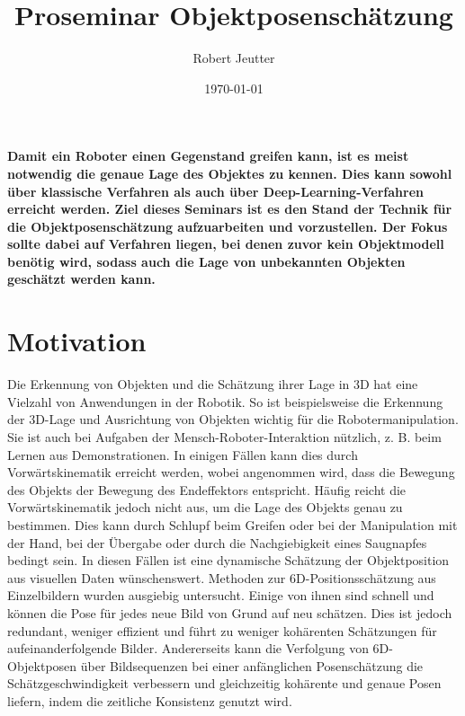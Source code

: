 \documentclass[a4paper, 11pt]{article}
\title{Proseminar Objektposenschätzung}
\author{Robert Jeutter}
\date{\today}
\begin{document}
\maketitle

\begin{multicols*}{2}
    \textbf{
        Damit ein Roboter einen Gegenstand greifen kann, ist es meist notwendig die genaue Lage des Objektes zu kennen. Dies kann sowohl über klassische Verfahren als auch über Deep-Learning-Verfahren erreicht werden. Ziel dieses Seminars ist es den Stand der Technik für die Objektposenschätzung aufzuarbeiten und vorzustellen. Der Fokus sollte dabei auf Verfahren liegen, bei denen zuvor kein Objektmodell benötig wird, sodass auch die Lage von unbekannten Objekten geschätzt werden kann.
    }

    \section{Motivation}
    Die Erkennung von Objekten und die Schätzung ihrer Lage in 3D hat eine Vielzahl von Anwendungen in der Robotik. So ist beispielsweise die Erkennung der 3D-Lage und Ausrichtung von Objekten wichtig für die Robotermanipulation. Sie ist auch bei Aufgaben der Mensch-Roboter-Interaktion nützlich, z. B. beim Lernen aus Demonstrationen.
    In einigen Fällen kann dies durch Vorwärtskinematik erreicht werden, wobei angenommen wird, dass die Bewegung des Objekts der Bewegung des Endeffektors entspricht. Häufig reicht die Vorwärtskinematik jedoch nicht aus, um die Lage des Objekts genau zu bestimmen. Dies kann durch Schlupf beim Greifen oder bei der Manipulation mit der Hand, bei der Übergabe oder durch die Nachgiebigkeit eines Saugnapfes bedingt sein. In diesen Fällen ist eine dynamische Schätzung der Objektposition aus visuellen Daten wünschenswert.
    Methoden zur 6D-Positionsschätzung aus Einzelbildern wurden ausgiebig untersucht. Einige von ihnen sind schnell und können die Pose für jedes neue Bild von Grund auf neu schätzen. Dies ist jedoch redundant, weniger effizient und führt zu weniger kohärenten Schätzungen für aufeinanderfolgende Bilder. Andererseits kann die Verfolgung von 6D-Objektposen über Bildsequenzen bei einer anfänglichen Posenschätzung die Schätzgeschwindigkeit verbessern und gleichzeitig kohärente und genaue Posen liefern, indem die zeitliche Konsistenz genutzt wird.


\end{multicols*}
\end{document}
